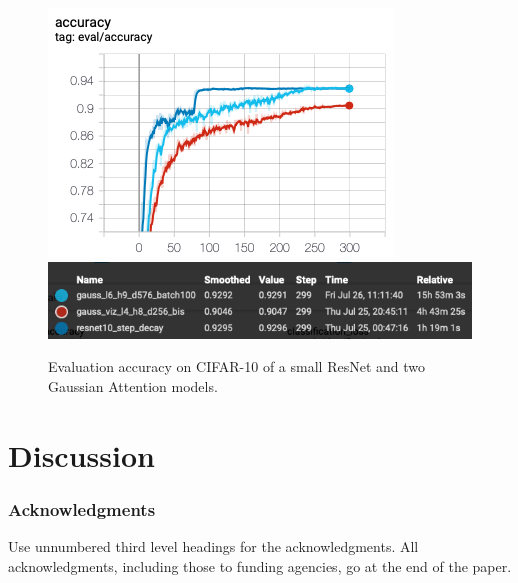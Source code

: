 \documentclass{article} %
\begin{document}
\begin{figure}[h]
  \includegraphics[width=.4\linewidth]{plots/eval_accuracy_plot.png}
  \hfill
  \includegraphics[width=.6\linewidth]{plots/eval_accuracy_legend.png}
  \caption{Evaluation accuracy on CIFAR-10 of a small ResNet and two Gaussian Attention models.}
\end{figure}



\section{Discussion}




\subsubsection*{Acknowledgments}
Use unnumbered third level headings for the acknowledgments. All
acknowledgments, including those to funding agencies, go at the end of the paper.





\end{document}
